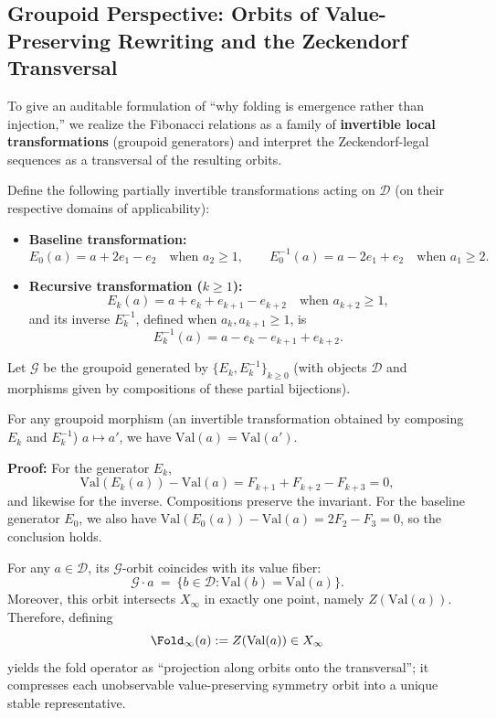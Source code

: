 \subsection{Groupoid Perspective: Orbits of Value-Preserving Rewriting and the Zeckendorf Transversal}\label{sec:groupoid-zeckendorf}

To give an auditable formulation of ``why folding is emergence rather than injection,'' we realize the Fibonacci relations as a family of \textbf{invertible local transformations} (groupoid generators) and interpret the Zeckendorf-legal sequences as a transversal of the resulting orbits.

\begin{definition}\label{def:fib-moves}
Define the following partially invertible transformations acting on $\mathcal{D}$ (on their respective domains of applicability):
\begin{itemize}
  \item \textbf{Baseline transformation:}
  \[
  E_0(a)=a+2e_1-e_2\quad\text{when }a_{2}\ge 1,
  \qquad
  E_0^{-1}(a)=a-2e_1+e_2\quad\text{when }a_{1}\ge 2.
  \]
  \item \textbf{Recursive transformation ($k\ge 1$):}
  \[
  E_k(a)=a+e_k+e_{k+1}-e_{k+2}\quad\text{when }a_{k+2}\ge 1,
  \]
  and its inverse $E_k^{-1}$, defined when $a_k,a_{k+1}\ge 1$, is
  \[
  E_k^{-1}(a)=a-e_k-e_{k+1}+e_{k+2}.
  \]
\end{itemize}
Let $\mathcal{G}$ be the groupoid generated by $\{E_k,E_k^{-1}\}_{k\ge 0}$ (with objects $\mathcal{D}$ and morphisms given by compositions of these partial bijections).
\end{definition}

\begin{proposition}\label{prop:orbits-preserve-val}
For any groupoid morphism (an invertible transformation obtained by composing $E_k$ and $E_k^{-1}$) $a\mapsto a'$, we have $\mathrm{Val}(a)=\mathrm{Val}(a')$.
\end{proposition}

\textbf{Proof:}
For the generator $E_k$,
\[
\mathrm{Val}(E_k(a))-\mathrm{Val}(a)
=F_{k+1}+F_{k+2}-F_{k+3}=0,
\]
and likewise for the inverse. Compositions preserve the invariant.
For the baseline generator $E_0$, we also have $\mathrm{Val}(E_0(a))-\mathrm{Val}(a)=2F_2-F_3=0$, so the conclusion holds.

\begin{theorem}\label{thm:zeckendorf-transversal}
For any $a\in\mathcal{D}$, its $\mathcal{G}$-orbit coincides with its value fiber:
\[
\mathcal{G}\cdot a \ =\ \{b\in\mathcal{D}:\mathrm{Val}(b)=\mathrm{Val}(a)\}.
\]
Moreover, this orbit intersects $X_\infty$ in exactly one point, namely $Z(\mathrm{Val}(a))$. Therefore, defining
\[
\Fold_\infty(a):=Z(\mathrm{Val}(a))\in X_\infty
\]
yields the fold operator as ``projection along orbits onto the transversal''; it compresses each unobservable value-preserving symmetry orbit into a unique stable representative.
\end{theorem}

